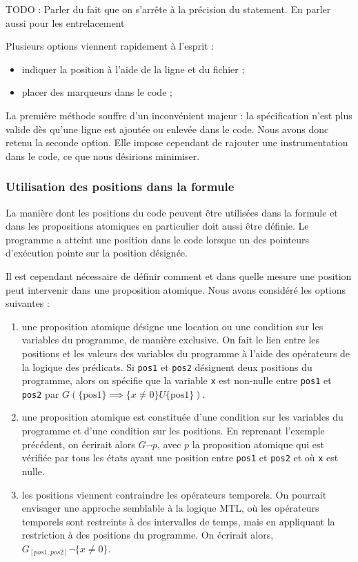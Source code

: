 TODO : Parler du fait que on s'arrête à la précision du statement. En
parler aussi pour les entrelacement

Plusieurs options viennent rapidement à l'esprit :

\begin{itemize}
\item
  indiquer la position à l'aide de la ligne et du fichier ;
\item
  placer des marqueurs dans le code ;
\end{itemize}

La première méthode souffre d'un inconvénient majeur : la spécification
n'est plus valide dès qu'une ligne est ajoutée ou enlevée dans le code.
Nous avons donc retenu la seconde option. Elle impose cependant de
rajouter une instrumentation dans le code, ce que nous désirions
minimiser.

\subsubsection{Utilisation des positions dans la formule}

La manière dont les positions du code peuvent être utilisées dans la
formule et dans les propositions atomiques en particulier doit aussi
être définie. Le programme a atteint une position dans le code lorsque
un des pointeurs d'exécution pointe sur la position désignée.

Il est cependant nécessaire de définir comment et dans quelle mesure une
position peut intervenir dans une proposition atomique. Nous avons
considéré les options suivantes :

\begin{enumerate}
\def\labelenumi{\arabic{enumi})}
\item
  une proposition atomique désigne une location ou une condition sur les
  variables du programme, de manière exclusive. On fait le lien entre les
  positions et les valeurs des variables du programme à l'aide des opérateurs de
  la logique des prédicats. Si \lstinline!pos1! et \lstinline!pos2! désignent
  deux positions du programme, alors on spécifie que la variable \lstinline!x!
  est non-nulle entre \lstinline!pos1! et \lstinline!pos2! par \(G
  (\{\text{pos1}\}\implies \{x \neq 0\} U \{\text{pos1}\})\).
\item
  une proposition atomique est constituée d'une condition sur les variables du
  programme et d'une condition sur les positions. En reprenant l'exemple
  précédent, on écrirait alors \(G \lnot p\), avec \(p\) la proposition atomique
  qui est vérifiée par tous les états ayant une position entre \lstinline!pos1!
  et \lstinline!pos2! et où \lstinline!x! est nulle.
\item
  les positions viennent contraindre les opérateurs temporels. On pourrait
  envisager une approche semblable à la logique MTL\cite{mtl_definition}, où les
  opérateurs temporels sont restreints à des intervalles de temps, mais en
  appliquant la restriction à des positions du programme. On écrirait alors,
  \(G_{[pos1, pos2]} \lnot \{ x \neq 0 \}\).
\end{enumerate}


